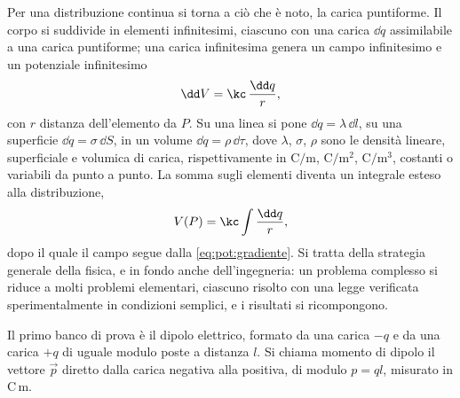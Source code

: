\documentclass[main.tex]{subfiles}
\begin{document}
	Per una distribuzione continua si torna a ciò che è noto, la carica puntiforme. Il corpo si suddivide in elementi infinitesimi, ciascuno con una carica $\dd q$ assimilabile a una carica puntiforme; una carica infinitesima genera un campo infinitesimo e un potenziale infinitesimo
	\[
	\dd V=\kc\,\frac{\dd q}{r},
	\]
	con $r$ distanza dell'elemento da $P$. Su una linea si pone $\dd q=\lambda\,\dd l$, su una superficie $\dd q=\sigma\,\dd S$, in un volume $\dd q=\rho\,\dd\tau$, dove $\lambda$, $\sigma$, $\rho$ sono le densità lineare, superficiale e volumica di carica, rispettivamente in $\mathrm{C/m}$, $\mathrm{C/m^2}$, $\mathrm{C/m^3}$, costanti o variabili da punto a punto. La somma sugli elementi diventa un integrale esteso alla distribuzione,
	\begin{equation}\label{eq:pot:Vcontinua}
		V(P)=\kc\int\frac{\dd q}{r},
	\end{equation}
	dopo il quale il campo segue dalla \eqref{eq:pot:gradiente}. Si tratta della strategia generale della fisica, e in fondo anche dell'ingegneria: un problema complesso si riduce a molti problemi elementari, ciascuno risolto con una legge verificata sperimentalmente in condizioni semplici, e i risultati si ricompongono.
	
	Il primo banco di prova è il dipolo elettrico, formato da una carica $-q$ e da una carica $+q$ di uguale modulo poste a distanza $l$. Si chiama momento di dipolo il vettore $\vec p$ diretto dalla carica negativa alla positiva, di modulo $p=ql$, misurato in $\mathrm{C\,m}$.
	
\end{document}
